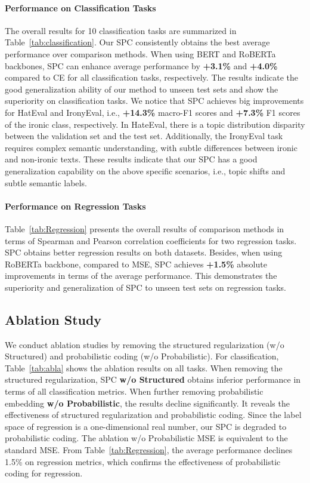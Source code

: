 \documentclass[letterpaper]{article} %
\begin{document}
\paragraph{Performance on Classification Tasks}
The overall results for 10 classification tasks are summarized in Table~\ref{tab:classification}.
Our SPC consistently obtains the best average performance over comparison methods.
When using BERT and RoBERTa backbones, SPC can enhance average performance by \textbf{+3.1\%} and \textbf{+4.0\%} compared to CE for all classification tasks, respectively.
The results indicate the good generalization ability of our method to unseen test sets and show the superiority on classification tasks. 
We notice that SPC achieves big improvements for HatEval and IronyEval, i.e., \textbf{+14.3\%} macro-F1 scores and \textbf{+7.3\%} F1 scores of the ironic class, respectively.
In HateEval, there is a topic distribution disparity between the validation set and the test set. Additionally, the IronyEval task requires complex semantic understanding, with subtle differences between ironic and non-ironic texts. These results indicate that our SPC has a good generalization capability on the above specific scenarios, i.e., topic shifts and subtle semantic labels.



\paragraph{Performance on Regression Tasks}
Table~\ref{tab:Regression} presents the overall results of comparison methods in terms of Spearman and Pearson correlation coefficients for two regression tasks.
SPC obtains better regression results on both datasets. Besides, when using RoBERTa backbone, compared to MSE, SPC achieves \textbf{+1.5\%} absolute improvements in terms of the average performance. 
This demonstrates the superiority and generalization of SPC to unseen test sets on regression tasks. 



\subsection{Ablation Study}
We conduct ablation studies by removing the structured regularization (w/o Structured) and probabilistic coding (w/o Probabilistic).
For classification, Table~\ref{tab:abla} shows the ablation results on all tasks.
When removing the structured regularization, SPC \textbf{w/o Structured} obtains inferior performance in terms of all classification metrics.
When further removing probabilistic embedding \textbf{w/o Probabilistic}, the results decline significantly. It reveals the effectiveness of structured regularization and probabilistic coding. 
Since the label space of regression is a one-dimensional real number, our SPC is degraded to probabilistic coding. The ablation w/o Probabilistic MSE is equivalent to the standard MSE. From Table~\ref{tab:Regression}, the average performance declines 1.5\% on regression metrics, which confirms the effectiveness of probabilistic coding for regression. 
\end{document}
